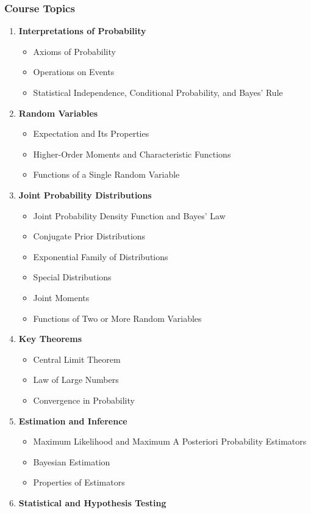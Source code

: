 \documentclass[12pt]{article}
\begin{document}
\subsubsection*{Course Topics}
\begin{enumerate}
    \item \textbf{Interpretations of Probability}
    \begin{itemize}
        \item Axioms of Probability
        \item Operations on Events
        \item Statistical Independence, Conditional Probability, and Bayes' Rule
    \end{itemize}
    \item \textbf{Random Variables}
    \begin{itemize}
        \item Expectation and Its Properties
        \item Higher-Order Moments and Characteristic Functions
        \item Functions of a Single Random Variable
    \end{itemize}
    \item \textbf{Joint Probability Distributions}
    \begin{itemize}
        \item Joint Probability Density Function and Bayes' Law
        \item Conjugate Prior Distributions
        \item Exponential Family of Distributions
        \item Special Distributions
        \item Joint Moments
        \item Functions of Two or More Random Variables
    \end{itemize}
    \item \textbf{Key Theorems}
    \begin{itemize}
        \item Central Limit Theorem
        \item Law of Large Numbers
        \item Convergence in Probability
    \end{itemize}
    \item \textbf{Estimation and Inference}
    \begin{itemize}
        \item Maximum Likelihood and Maximum A Posteriori Probability Estimators
        \item Bayesian Estimation
        \item Properties of Estimators
    \end{itemize}
    \item \textbf{Statistical and Hypothesis Testing}
\end{enumerate}
\end{document}
